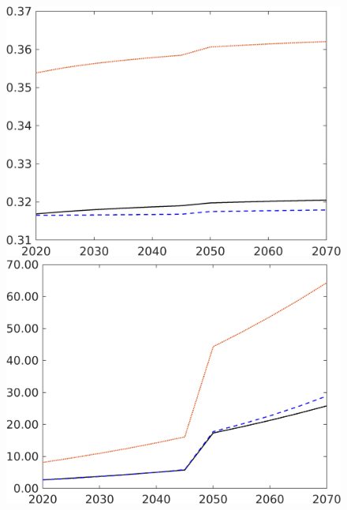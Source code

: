 \begin{figure}[h!!]
\begin{minipage}[]{0.32\textwidth}
	\end{minipage}
	\begin{minipage}[]{0.32\textwidth}
		\includegraphics[width=1\textwidth]{../../codding_model/own_basedOnFried/optimalPol_190722_tidiedUp/figures/all_10Aout22/CompMod1_OPT_T_NoTaus_hl_regime3_spillover0_noskill0_sep1_xgrowth0_extern0_etaa0.79_lgd0.png}
	\end{minipage}
	\begin{minipage}[]{0.32\textwidth}
		\includegraphics[width=1\textwidth]{../../codding_model/own_basedOnFried/optimalPol_190722_tidiedUp/figures/all_10Aout22/CompMod1_OPT_T_NoTaus_GFF_regime3_spillover0_noskill0_sep1_xgrowth0_extern0_etaa0.79_lgd0.png}

\end{minipage}
\end{figure}
